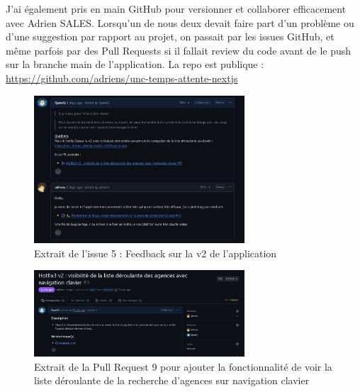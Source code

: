 \documentclass[12pt,a4paper]{report}
\begin{document}
\vspace{1cm}
J’ai également pris en main GitHub pour versionner et collaborer efficacement avec Adrien SALES. Lorsqu'un de nous deux devait faire part d'un problème ou d'une suggestion par rapport au projet, on passait par les issues GitHub, et même parfois par des Pull Requests si il fallait review du code avant de le push sur la branche main de l'application. La repo est publique : \href{https://github.com/adriens/unc-temps-attente-nextjs}{https://github.com/adriens/unc-temps-attente-nextjs}

\vspace{1cm}
\begin{figure}[h] %
    \centering
    \includegraphics[width=0.7\textwidth]{ressources_rapport/extrait_issue_5.JPG}
    \caption{Extrait de l'issue 5 : Feedback sur la v2 de l'application}
\end{figure}

\begin{figure}[h] %
    \centering
    \includegraphics[width=0.7\textwidth]{ressources_rapport/extrait_pr_9.JPG}
    \caption{Extrait de la Pull Request 9 pour ajouter la fonctionnalité de voir la liste déroulante de la recherche d'agences sur navigation clavier}
\end{figure}
\newpage
\end{document}
